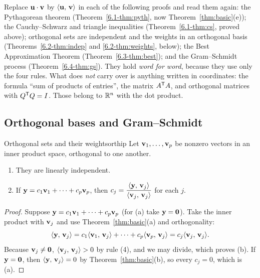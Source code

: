 \documentclass[11pt]{article}
\begin{document}
\begin{remark}
 Replace $\mathbf{u}\cdot\mathbf{v}$ by $\langle \mathbf{u},\,\mathbf{v}\rangle$ in each of the following proofs and read them again: the Pythagorean theorem (Theorem~\ref{6.1-thm:pyth}, now Theorem~\ref{thm:basic}(e)); the Cauchy--Schwarz and triangle inequalities (Theorem~\ref{6.1-thm:cs}, proved above); orthogonal sets are independent and the weights in an orthogonal basis (Theorems~\ref{6.2-thm:indep} and \ref{6.2-thm:weights}, below); the Best Approximation Theorem (Theorem~\ref{6.3-thm:best}); and the Gram--Schmidt process (Theorem~\ref{6.4-thm:gs}). They hold \emph{word for word}, because they use only the four rules. What does \emph{not} carry over is anything written in coordinates: the formula ``sum of products of entries'', the matrix $A^{\mathsf T} A$, and orthogonal matrices with $Q^{\mathsf T} Q=I$. Those belong to $\mathbb{R}^n$ with the dot product.
\end{remark}

\subsection*{Orthogonal bases and Gram--Schmidt}

\begin{thm}{Orthogonal sets and their weights}{orthip}
Let $\mathbf{v}_1,\dots,\mathbf{v}_p$ be nonzero vectors in an inner product space, orthogonal to one another.
\begin{enumerate}[label=(\alph*),itemsep=1pt]
  \item They are linearly independent.
  \item If $\mathbf{y}=c_1\mathbf{v}_1+\cdots+c_p\mathbf{v}_p$, then $c_j=\dfrac{\langle \mathbf{y},\,\mathbf{v}_j\rangle}{\langle \mathbf{v}_j,\,\mathbf{v}_j\rangle}$ for each $j$.
\end{enumerate}
\end{thm}

\begin{proof}
Suppose $\mathbf{y}=c_1\mathbf{v}_1+\cdots+c_p\mathbf{v}_p$ (for (a) take $\mathbf{y}=\mathbf{0}$). Take the inner product with $\mathbf{v}_j$ and use Theorem~\ref{thm:basic}(a) and orthogonality:
\[
\langle \mathbf{y},\,\mathbf{v}_j\rangle=c_1\langle \mathbf{v}_1,\,\mathbf{v}_j\rangle+\cdots+c_p\langle \mathbf{v}_p,\,\mathbf{v}_j\rangle=c_j\langle \mathbf{v}_j,\,\mathbf{v}_j\rangle.
\]
Because $\mathbf{v}_j\neq\mathbf{0}$, $\langle \mathbf{v}_j,\,\mathbf{v}_j\rangle>0$ by rule (4), and we may divide, which proves (b). If $\mathbf{y}=\mathbf{0}$, then $\langle \mathbf{y},\,\mathbf{v}_j\rangle=0$ by Theorem~\ref{thm:basic}(b), so every $c_j=0$, which is (a).
\end{proof}
\end{document}

